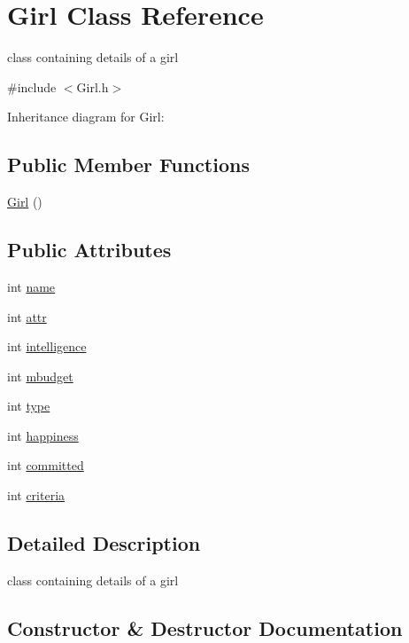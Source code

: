 \hypertarget{classGirl}{}\section{Girl Class Reference}
\label{classGirl}


class containing details of a girl  




{\ttfamily \#include $<$Girl.\+h$>$}



Inheritance diagram for Girl\+:
\subsection*{Public Member Functions}
\begin{DoxyCompactItemize}
\item 
\hyperlink{classGirl_ab1997d704355d9168ea97aea12c7727a}{Girl} ()
\end{DoxyCompactItemize}
\subsection*{Public Attributes}
\begin{DoxyCompactItemize}
\item 
int \hyperlink{classGirl_ae05b0ddae0fdca022bd74a8060421b9c}{name}
\item 
int \hyperlink{classGirl_a136078d5111d5dc1fef6a35f84b38c01}{attr}
\item 
int \hyperlink{classGirl_a751f8b9d8f1ba139d3f512eb198c16f4}{intelligence}
\item 
int \hyperlink{classGirl_a81c1cf79fd9153b32d73d0e1e34255fa}{mbudget}
\item 
int \hyperlink{classGirl_ac0242bb0ae7c23f69a75537437f76586}{type}
\item 
int \hyperlink{classGirl_a50337447735a8f518fd817338d04d5b9}{happiness}
\item 
int \hyperlink{classGirl_ac5829e7ec762f1a3fb7484acfd6c1680}{committed}
\item 
int \hyperlink{classGirl_a77bea2ccde6f82919fece9398519f85e}{criteria}
\end{DoxyCompactItemize}


\subsection{Detailed Description}
class containing details of a girl 

\subsection{Constructor \& Destructor Documentation}
